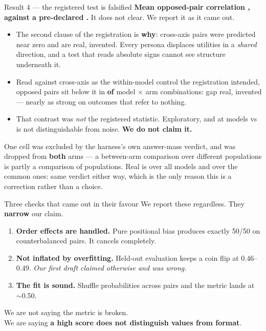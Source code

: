\documentclass[aspectratio=169,11pt]{beamer}
\newcommand{\hl}[1]{\textcolor{accent}{\textbf{#1}}}
\begin{document}
\begin{frame}{Result 4 --- the registered test is falsified}
  \textbf{Mean opposed-pair correlation \hl{\SchOpposedR{}}, against a
  pre-declared \SchThreshold{}.} It does not clear. We report it as it came out.

  \bigskip
  \begin{itemize}
    \item The second clause of the registration is \hl{why}: cross-axis pairs
      were predicted near zero and are \SchCrossR{} real, \SchCrossN{} invented.
      Every persona displaces utilities in a \emph{shared} direction, and a test
      that reads absolute signs cannot see structure underneath it.
    \item Read against cross-axis as the within-model control the registration
      intended, opposed pairs sit below it in \hl{\SchBelowTotal{} of
      \SchBelowDenom{}} model $\times$ arm combinations: gap \SchGapR{} real,
      \SchGapN{} invented --- nearly as strong on outcomes that refer to nothing.
    \item That contrast was \emph{not} the registered statistic. Exploratory,
      and at \SchNModels{} models \SchGapR{} vs \SchGapN{} is not
      distinguishable from noise. \hl{We do not claim it.}
  \end{itemize}

  \bigskip
  \small
  One cell was excluded by the harness's own answer-mass verdict, and
  \SchDropped{} was dropped from \hl{both} arms --- a between-arm comparison
  over different populations is partly a comparison of populations. Real is
  \SchOpposedRAll{} over all \SchNModelsAll{} models and \SchOpposedR{} over the
  \SchNModels{} common ones: same verdict either way, which is the only reason
  this is a correction rather than a choice.
\end{frame}

\begin{frame}{Three checks that came out in their favour}
  We report these regardless. They \hl{narrow} our claim.

  \bigskip
  \begin{enumerate}
    \item \textbf{Order effects are handled.} Pure positional bias produces
      exactly 50/50 on counterbalanced pairs. It cancels completely.
    \item \textbf{Not inflated by overfitting.} Held-out evaluation keeps a
      coin flip at 0.46--0.49. \emph{Our first draft claimed otherwise and was
      wrong.}
    \item \textbf{The fit is sound.} Shuffle probabilities across pairs and the
      metric lands at $\sim$0.50.
  \end{enumerate}

  \bigskip
  \begin{center}
  We are not saying the metric is broken.\\
  We are saying \hl{a high score does not distinguish values from format}.
  \end{center}
\end{frame}
\end{document}
